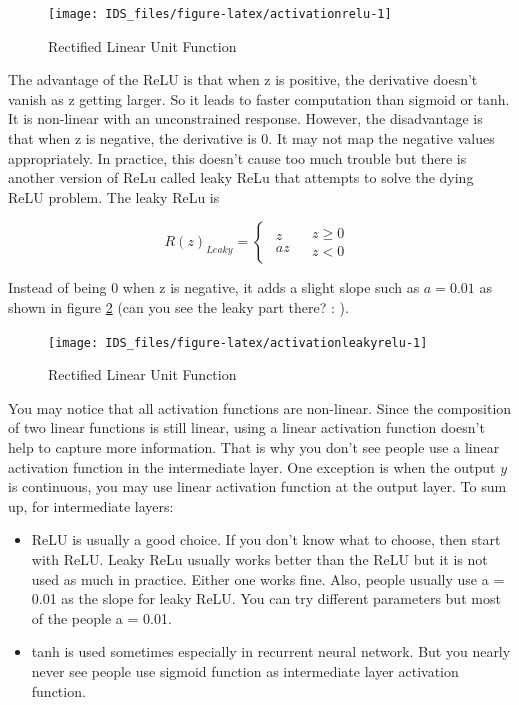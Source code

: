 \documentclass[
  12pt,
]{krantz}
\providecommand{\tightlist}{%
  \setlength{\itemsep}{0pt}\setlength{\parskip}{0pt}}
\begin{document}
\begin{figure}

{\centering \texttt{[image: IDS\_files/figure-latex/activationrelu-1]} 

}

\caption{Rectified Linear Unit Function}\label{fig:activationrelu}
\end{figure}

The advantage of the ReLU is that when z is positive, the derivative doesn't vanish as z getting larger. So it leads to faster computation than sigmoid or tanh. It is non-linear with an unconstrained response. However, the disadvantage is that when z is negative, the derivative is 0. It may not map the negative values appropriately. In practice, this doesn't cause too much trouble but there is another version of ReLu called leaky ReLu that attempts to solve the dying ReLU problem. The leaky ReLu is

\[R(z)_{Leaky}=\begin{cases}
\begin{array}{c}
z\\
az
\end{array} & \begin{array}{c}
z\geq0\\
z<0
\end{array}\end{cases}\]

Instead of being 0 when z is negative, it adds a slight slope such as \(a=0.01\) as shown in figure \ref{fig:activationleakyrelu} (can you see the leaky part there? : ).

\begin{figure}

{\centering \texttt{[image: IDS\_files/figure-latex/activationleakyrelu-1]} 

}

\caption{Rectified Linear Unit Function}\label{fig:activationleakyrelu}
\end{figure}

You may notice that all activation functions are non-linear. Since the composition of two linear functions is still linear, using a linear activation function doesn't help to capture more information. That is why you don't see people use a linear activation function in the intermediate layer. One exception is when the output \(y\) is continuous, you may use linear activation function at the output layer. To sum up, for intermediate layers:

\begin{itemize}
\tightlist
\item
  ReLU is usually a good choice. If you don't know what to choose, then start with ReLU. Leaky ReLu usually works better than the ReLU but it is not used as much in practice. Either one works fine. Also, people usually use a = 0.01 as the slope for leaky ReLU. You can try different parameters but most of the people a = 0.01.
\item
  tanh is used sometimes especially in recurrent neural network. But you nearly never see people use sigmoid function as intermediate layer activation function.
\end{itemize}
\end{document}
